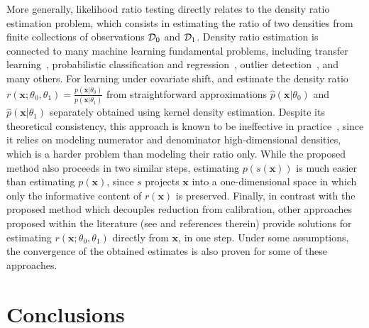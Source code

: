 \documentclass[12pt]{article}
\numberwithin{equation}{section}
\theoremstyle{plain}
\begin{document}
More generally, likelihood ratio testing directly relates to the density ratio
estimation problem, which consists in estimating the ratio of two
densities from finite collections of observations ${\cal D}_0$ and
${\cal D}_1$. Density ratio estimation is connected to many machine learning
fundamental problems, including transfer learning~\citep{sugiyama2012machine},
probabilistic classification and regression~\citep{vapnik1998statistical},
outlier detection~\citep{hido2011statistical}, and many others. For learning
under covariate shift, \cite{shimodaira2000improving} and \cite{sugiyama2005input} estimate
the density ratio $r(\mathbf{x};\theta_0,\theta_1) =
\frac{p(\mathbf{x}|\theta_0)}{p(\mathbf{x}|\theta_1)}$ from straightforward
approximations $\hat{p}(\mathbf{x}|\theta_0)$ and $\hat{p}(\mathbf{x}|\theta_1)$
separately obtained using kernel density estimation. Despite its theoretical
consistency, this approach is known to be ineffective in
practice~\citep{sugiyama2007covariate,bickel2009discriminative}, since
it relies on modeling numerator and denominator high-dimensional densities,
which is a harder problem than modeling their ratio only.
While the proposed method also proceeds in two similar steps, estimating
$p(s(\mathbf{x}))$ is much easier than estimating $p(\mathbf{x})$,
since $s$ projects $\mathbf{x}$ into a one-dimensional space in which only
the informative content of $r(\mathbf{x})$ is preserved.
Finally, in contrast with the
proposed method which decouples reduction from calibration, other
approaches proposed within the literature (see
\cite{sugiyama2012density,gretton2009covariate,nguyen2010estimating,vapnik2013constructive}
and references therein) provide solutions for estimating
$r(\mathbf{x};\theta_0,\theta_1)$ directly from $\mathbf{x}$, in one step. Under some
assumptions, the convergence of the obtained estimates is also proven for some
of these approaches.



\section{Conclusions}
\label{sec:conclusions}
\end{document}
